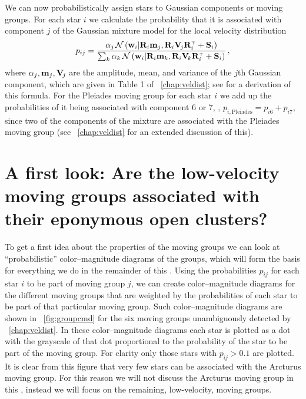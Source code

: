 We can now probabilistically assign stars to Gaussian components or
moving groups. For each star $i$ we calculate the probability that it
is associated with component $j$ of the Gaussian mixture model for the
local velocity distribution
\begin{equation}\label{eq:pij}
p_{ij} = \frac{\alpha_j\,\mathcal{N}\left(\mathbf{w}_i | \mathbf{R}_i \mathbf{m}_j, \mathbf{R}_i \mathbf{V}_{\!j}
\mathbf{R}_i^{\scriptscriptstyle \top} + \mathbf{S}_i\right)}{\sum_k\alpha_k\,\mathcal{N}\left(\mathbf{w}_i | \mathbf{R}_i \mathbf{m}_k, \mathbf{R}_i \mathbf{V}_{\!k}
\mathbf{R}_i^{\scriptscriptstyle \top}+\mathbf{S}_i\right)}\,,
\end{equation}
where $\alpha_j,\mathbf{m}_j,\mathbf{V}_{\!j}$ are the amplitude, mean, and variance of
the $j$th Gaussian component, which are given in Table 1
of \chaptername~\ref{chap:veldist}; see
\citet{BovyXD} for a derivation of this formula. For the Pleiades
moving group for each star $i$ we add up the probabilities of it being
associated with component 6 or 7, \ie, $p_{i,\mathrm{Pleiades}} =
p_{i6}+p_{i7}$, since two of the components of the mixture are
associated with the Pleiades moving group
(see \chaptername~\ref{chap:veldist} for an extended discussion of
this).



\section{A first look: Are the low-velocity moving groups associated with their eponymous open clusters?}\label{sec:firstlook}

To get a first idea about the properties of the moving groups we can
look at ``probabilistic'' color--magnitude diagrams of the groups,
which will form the basis for everything we do in the remainder of
this \chaptername. Using the probabilities $p_{ij}$ for each star $i$
to be part of moving group $j$, we can create color--magnitude
diagrams for the different moving groups that are weighted by the
probabilities of each star to be part of that particular moving
group. Such color--magnitude diagrams are shown
in \figurename~\ref{fig:groupcmd} for the six moving groups
unambiguously detected by \chaptername~\ref{chap:veldist}. In these
color--magnitude diagrams each star is plotted as a dot with the
grayscale of that dot proportional to the probability of the star to
be part of the moving group. For clarity only those stars with $p_{ij}
> 0.1$ are plotted. It is clear from this figure that very few stars
can be associated with the Arcturus moving group. For this reason we
will not discuss the Arcturus moving group in this \chaptername,
instead we will focus on the remaining, low-velocity, moving groups.

